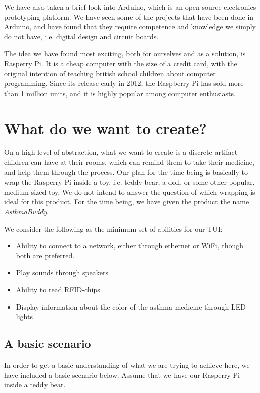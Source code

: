 We have also taken a brief look into Arduino, which is an open source electronics prototyping platform\cite{arduino}. We have seen some of the projects that have been done in Arduino, and have found that they require competence and knowledge we simply do not have, i.e. digital design and circuit boards. 


The idea we have found most exciting, both for ourselves and as a solution, is Rasperry Pi\cite{rasperrypi}. It is a cheap computer with the size of a credit card, with the original intention of teaching british school children about computer programming\cite{rasperrypi-about}. Since its release early in 2012, the Raspberry Pi has sold more than 1 million units, and it is highly popular among computer enthusiasts\cite{pimillion}. 


\section{What do we want to create?}
On a high level of abstraction, what we want to create is a discrete artifact children can have at their rooms, which can remind them to take their medicine, and help them through the process. Our plan for the time being is basically to wrap the Rasperry Pi inside a toy, i.e. teddy bear, a doll, or some other popular, medium sized toy. We do not intend to answer the question of which wrapping is ideal for this product. For the time being, we have given the product the name \emph{AsthmaBuddy}. 

We consider the following as the minimum set of abilities for our TUI:

\begin{itemize}
  \item Ability to connect to a network, either through ethernet or WiFi, though both are preferred. 
  \item Play sounds through speakers
  \item Ability to read RFID-chips
  \item Display information about the color of the asthma medicine through LED-lights
\end{itemize} 

\subsection{A basic scenario}
In order to get a basic understanding of what we are trying to achieve here, we have included a basic scenario below. Assume that we have our Rasperry Pi inside a teddy bear.  

